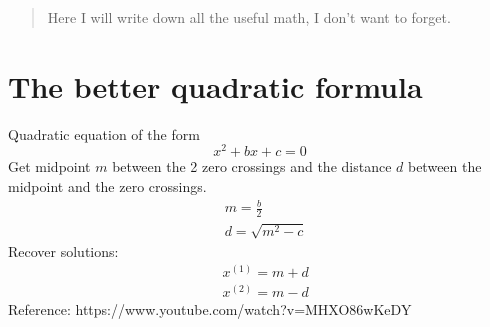 \documentclass[12pt]{article}
\begin{document}
\maketitle

\begin{abstract}
Here I will write down all the useful math, I don't want to forget.
\end{abstract}

\section{The better quadratic formula}
Quadratic equation of the form
\begin{equation}
x^2+bx+c = 0
\end{equation}
Get midpoint $m$ between the 2 zero crossings and the distance $d$ between the midpoint and the zero crossings.
\begin{equation}
\begin{aligned}
&m = \frac{b}{2}\\
&d = \sqrt{m^2-c}
\end{aligned}
\end{equation}
Recover solutions:
\begin{equation}
\begin{aligned}
&x^{(1)} = m+d\\
&x^{(2)} = m-d
\end{aligned}
\end{equation}
Reference: https://www.youtube.com/watch?v=MHXO86wKeDY
\end{document}
